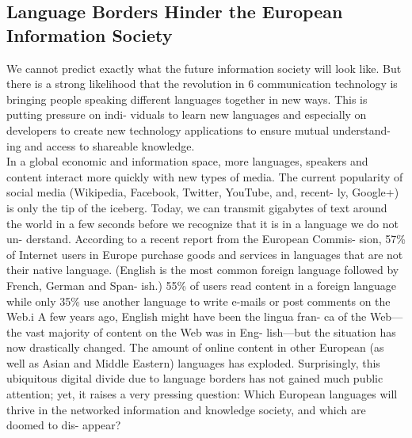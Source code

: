 \documentclass[]{../metanetpaper}
\begin{document}
\subsection{Language Borders Hinder the European
Information Society}
We cannot predict exactly what the future information society will
look like. But there is a strong likelihood that the revolution in
6
communication technology is bringing people speaking different
languages together in new ways. This is putting pressure on indi-
viduals to learn new languages and especially on developers to
create new technology applications to ensure mutual understand-
ing and access to shareable knowledge.\\
In a global economic and
information space, more languages, speakers and content interact
more quickly with new types of media. The current popularity of
social media (Wikipedia, Facebook, Twitter, YouTube, and, recent-
ly, Google+) is only the tip of the iceberg. Today, we can transmit gigabytes of text around the world in a few
seconds before we recognize that it is in a language we do not un-
derstand. According to a recent report from the European Commis-
sion, 57\% of Internet users in Europe purchase goods and services
in languages that are not their native language. (English is the most
common foreign language followed by French, German and Span-
ish.) 55\% of users read content in a foreign language while only
35\% use another language to write e-mails or post comments on
the Web.i A few years ago, English might have been the lingua fran-
ca of the Web—the vast majority of content on the Web was in Eng-
lish—but the situation has now drastically changed. The amount of
online content in other European (as well as Asian and Middle
Eastern) languages has exploded.
Surprisingly, this ubiquitous digital divide due to language borders
has not gained much public attention; yet, it raises a very pressing
question: Which European languages will thrive in the networked
information and knowledge society, and which are doomed to dis-
appear?
\end{document}
